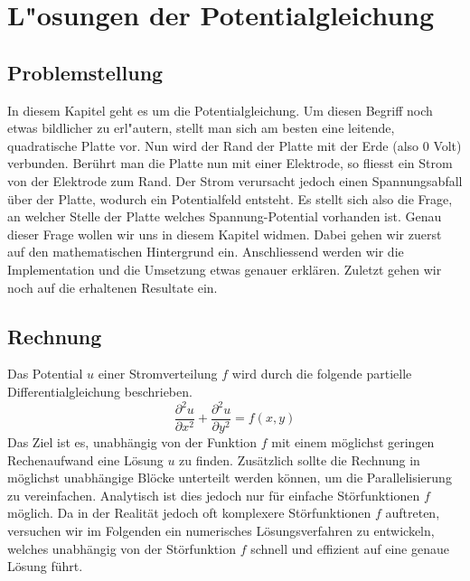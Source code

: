 \chapter{L"osungen der Potentialgleichung\label{chapter:potential}}
\begin{refsection}

\section{Problemstellung}
In diesem Kapitel geht es um die Potentialgleichung. Um diesen Begriff
noch etwas bildlicher zu erl"autern, stellt man sich am besten eine
leitende, quadratische Platte vor. Nun wird der Rand der Platte mit der
Erde (also 0 Volt) verbunden. Ber\"uhrt man die Platte nun mit einer
Elektrode, so fliesst ein Strom von der Elektrode zum Rand. Der Strom
verursacht jedoch einen Spannungsabfall \"uber der Platte, wodurch
ein Potentialfeld entsteht. Es stellt sich also die Frage, an welcher
Stelle der Platte welches Spannung-Potential vorhanden ist. Genau dieser
Frage wollen wir uns in diesem Kapitel widmen. Dabei gehen wir zuerst
auf den mathematischen Hintergrund ein. Anschliessend werden wir die
Implementation und die Umsetzung etwas genauer erkl\"aren. Zuletzt gehen
wir noch auf die erhaltenen Resultate ein.

\section{Rechnung}
Das Potential $u$ einer Stromverteilung $f$ wird durch die folgende
partielle Differentialgleichung beschrieben.
\begin{equation}\label{eq:gleichung}
\dfrac{\partial^2 u}{\partial x^2}+\dfrac{\partial^2 u}{\partial y^2} =f(x,y)
\end{equation}
Das Ziel ist es, unabh\"angig von der Funktion $f$ mit einem m\"oglichst
geringen Rechenaufwand eine L\"osung $u$ zu finden. Zus\"atzlich sollte
die Rechnung in m\"oglichst unabh\"angige Bl\"ocke unterteilt werden
k\"onnen, um die Parallelisierung zu vereinfachen. Analytisch ist dies
jedoch nur f\"ur einfache St\"orfunktionen $f$ m\"oglich. Da in der
Realit\"at jedoch oft komplexere St\"orfunktionen $f$ auftreten, versuchen
wir im Folgenden ein numerisches L\"osungsverfahren zu entwickeln,
welches unabh\"angig von der St\"orfunktion $f$ schnell und effizient
auf eine genaue L\"osung f\"uhrt.



\end{refsection}
